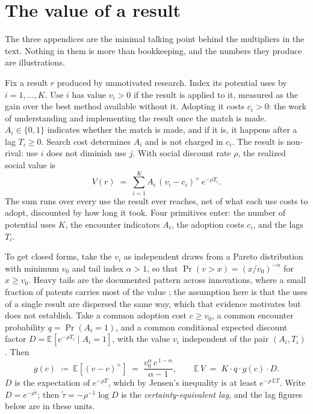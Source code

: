 \documentclass[11pt]{article}
\theoremstyle{definition}
\theoremstyle{remark}
\newcommand{\E}{\mathbb{E}}
\begin{document}
\appendix
\section{The value of a result}
\label{app:value}

The three appendices are the minimal talking point behind the multipliers in the text. Nothing in them is more than bookkeeping, and the numbers they produce are illustrations.

Fix a result $r$ produced by unmotivated research. Index its potential uses by $i = 1, \dots, K$. Use $i$ has value $v_i > 0$ if the result is applied to it, measured as the gain over the best method available without it. Adopting it costs $c_i > 0$: the work of understanding and implementing the result once the match is made. $A_i \in \{0, 1\}$ indicates whether the match is made, and if it is, it happens after a lag $T_i \ge 0$. Search cost determines $A_i$ and is not charged in $c_i$. The result is non-rival: use $i$ does not diminish use $j$. With social discount rate $\rho$, the realized social value is
\begin{equation}
V(r) \;=\; \sum_{i=1}^{K} A_i\,(v_i - c_i)^{+}\,e^{-\rho T_i}.
\label{eq:value}
\end{equation}
The sum runs over every use the result ever reaches, net of what each use costs to adopt, discounted by how long it took. Four primitives enter: the number of potential uses $K$, the encounter indicators $A_i$, the adoption costs $c_i$, and the lags $T_i$.

To get closed forms, take the $v_i$ as independent draws from a Pareto distribution with minimum $v_0$ and tail index $\alpha > 1$, so that $\Pr(v > x) = (x/v_0)^{-\alpha}$ for $x \ge v_0$. Heavy tails are the documented pattern across innovations, where a small fraction of patents carries most of the value \citep{scherer2000}; the assumption here is that the uses of a single result are dispersed the same way, which that evidence motivates but does not establish. Take a common adoption cost $c \ge v_0$, a common encounter probability $q = \Pr(A_i = 1)$, and a common conditional expected discount factor $D = \E[e^{-\rho T_i} \mid A_i = 1]$, with the value $v_i$ independent of the pair $(A_i, T_i)$. Then
\begin{equation}
g(c) \;\coloneqq\; \E[(v - c)^+] \;=\; \frac{v_0^{\alpha}\, c^{\,1-\alpha}}{\alpha - 1},
\qquad
\E\,V \;=\; K \cdot q \cdot g(c) \cdot D.
\label{eq:closed}
\end{equation}
$D$ is the expectation of $e^{-\rho T}$, which by Jensen's inequality is at least $e^{-\rho\, \E T}$. Write $D = e^{-\rho \tilde\tau}$; then $\tilde\tau = -\rho^{-1} \log D$ is the \emph{certainty-equivalent lag}, and the lag figures below are in these units.
\end{document}
